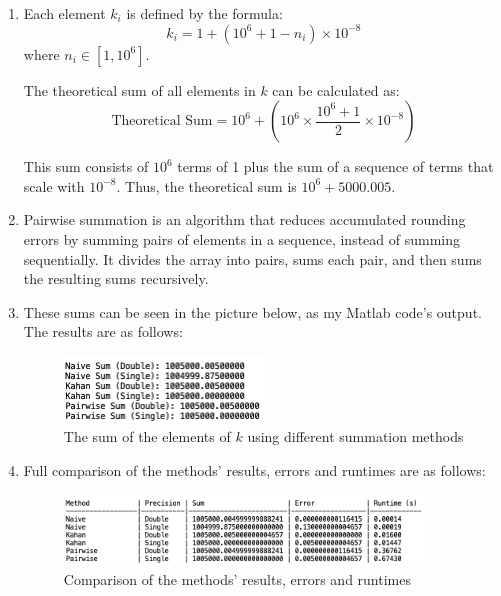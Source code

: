 \documentclass[11pt,a4paper, margin=1in]{article}
\begin{document}
\begin{enumerate}

    \item Each element \( k_i \) is defined by the formula:
    \[
    k_i = 1 + (10^6 + 1 - n_i) \times 10^{-8}
    \]
    where \( n_i \in [1, 10^6] \).
    
    The theoretical sum of all elements in \( k \) can be calculated as:
    \[
    \text{Theoretical Sum} = 10^6 + \left(10^6 \times \frac{10^6 + 1}{2} \times 10^{-8}\right)
    \]
    
    This sum consists of \( 10^6 \) terms of 1 plus the sum of a sequence of terms that scale with \( 10^{-8} \). Thus, the theoretical sum is \( 10^6 + 5000.005 \).

    \item Pairwise summation is an algorithm that reduces accumulated rounding errors by summing pairs of elements in a sequence, instead of summing sequentially. It divides the array into pairs, sums each pair, and then sums the resulting sums recursively.

    \item These sums can be seen in the picture below, as my Matlab code's output. The results are as follows:
    \begin{figure}[H]
        \centering
        \includegraphics[width=0.5\textwidth]{q2_1.png}
        \caption{The sum of the elements of \( k \) using different summation methods}
    \end{figure}

    \item Full comparison of the methods' results, errors and runtimes are as follows:
    \begin{figure}[H]
        \centering
        \includegraphics[width=0.9\textwidth]{q2_2.png}
        \caption{Comparison of the methods' results, errors and runtimes}
    \end{figure}


\end{enumerate}
\end{document}
